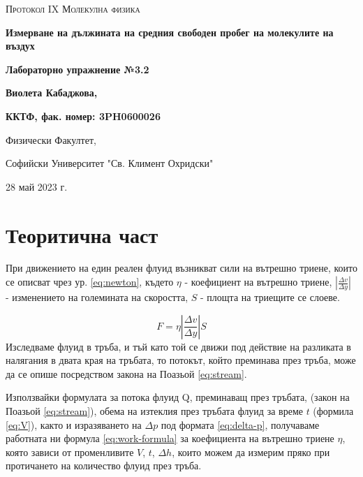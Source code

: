 \documentclass[12pt]{article}
\begin{document}
\begin{titlepage}
	\flushleft
	{\scshape\Large Протокол IX \hspace{2cm} Молекулна физика\par}
	\vspace{4cm}
	{\huge\bfseries Измерване на дължината на средния свободен пробег на молекулите на въздух\par}
	\vspace{1cm}
	{\LARGE\bfseries Лабораторно упражнение №3.2\par}
	\vspace{5cm}
    {\LARGE\bfseries Виолета Кабаджова, \par}
    {\large\bfseries ККТФ, фак. номер: 3PH0600026\par}
	\vspace{1cm}
	
	{\large Физически Факултет, 
	
	Софийски Университет "Св. Климент Охридски"
	
	28 май 2023 г.\par}
	
\end{titlepage}

\section{Теоритична част}\label{sec:theoretical-part}
При движението на един реален флуид възникват сили на вътрешно триене, които се описват чрез ур. \ref{eq:newton}, където $\eta$ - коефициент на вътрешно триене, $\left| \frac{\Delta v}{\Delta y}\right|$ - изменението на големината на скоростта, $S$ - площта на триещите се слоеве. 

\begin{equation}\label{eq:newton}
    F = \eta \left| \frac{\Delta v}{\Delta y}\right| S
\end{equation}
Изследваме флуид в тръба, и тъй като той се движи под действие на разликата в налягания в двата края на тръбата, то потокът, който преминава през тръба, може да се опише посредством закона на Поазьой \ref{eq:stream}.

Използвайки формулата за потока флуид Q, преминаващ през тръбата, (закон на Поазьой \ref{eq:stream}), обема на изтеклия през тръбата флуид за време $t$ (формила \ref{eq:V}), както и изразяването на $\Delta p$ под формата \ref{eq:delta-p}, получаваме работната ни формула \ref{eq:work-formula} за коефициента на вътрешно триене $\eta$, която зависи от променливите $V$, $t$, $\Delta h$, които можем да измерим пряко при протичането на количество флуид през тръба.
\end{document}
